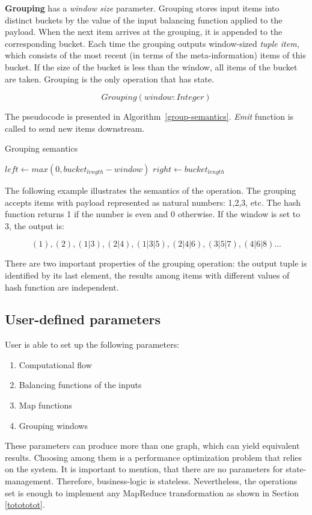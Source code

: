 {\bf Grouping} has a {\it window size} parameter. Grouping stores input items into distinct buckets by the value of the input balancing function applied to the payload. When the next item arrives at the grouping, it is appended to the corresponding bucket. Each time the grouping outputs window-sized {\it tuple item}, which consists of the most recent (in terms of the meta-information) items of this bucket. If the size of the bucket is less than the window, all items of the bucket are taken. Grouping is the only operation that has state.

\[Grouping(window: Integer)\]

The pseudocode is presented in Algorithm~\ref{group-semantics}. {\it Emit} function is called to send new items downstream.

\begin{algorithm}
\caption{Grouping semantics}
\label{group-semantics}
  \begin{algorithmic}[1]
      \State {}
      \State $left \gets max(0, bucket_{length} - window)$
      \State $right \gets bucket_{length}$
      \State {}
    \EndFunction
  \end{algorithmic}
\end{algorithm}

The following example illustrates the semantics of the operation. The grouping accepts items with payload represented as natural numbers: 1,2,3, etc. The hash function returns 1 if the number is even and 0 otherwise. If the window is set to 3, the output is:

\[(1), (2), (1|3), (2|4), (1|3|5), (2|4|6), (3|5|7), (4|6|8)...\]

There are two important properties of the grouping operation: the output tuple is identified by its last element, the results among items with different values of hash function are independent.

\subsection{User-defined parameters}

User is able to set up the following parameters:

\begin{enumerate}
  \item{Computational flow}
  \item{Balancing functions of the inputs}
  \item{Map functions}
  \item{Grouping windows}
\end{enumerate}

These parameters can produce more than one graph, which can yield equivalent results. Choosing among them is a performance optimization problem that relies on the system.
It is important to mention, that there are no parameters for state-management. Therefore, business-logic is stateless. Nevertheless, the operations set is enough to implement any MapReduce transformation as shown in Section \ref{totototot}.

